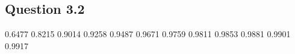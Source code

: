 \subsection*{Question 3.2}





    0.6477
    0.8215
    0.9014
    0.9258
    0.9487
    0.9671
    0.9759
    0.9811
    0.9853
    0.9881
    0.9901
    0.9917
